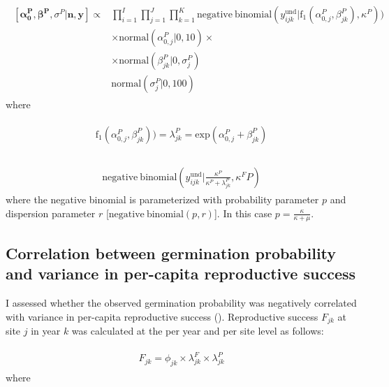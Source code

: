 \documentclass[12pt, oneside, titlepage]{article}   	%
\begin{document}
\begin{align}
  \begin{split}
 [ \bm{\alpha^P_0}, \bm{\beta^P}, \sigma^P | \bm{n}, \bm{y} ] \propto 
 & \prod_{i=1}^{I} \prod_{j=1}^{J} \prod_{k=1}^{K}  \mathrm{negative \ binomial} ( y^{\mathrm{und}}_{ijk} | \mathrm{f}_1(\alpha^P_{0,j} , \beta^P_{jk} ), \kappa^P ) )
     \\ & \times \mathrm{normal} ( \alpha^P_{0,j} | 0, 10)  \times 
     \\ & \times \mathrm{normal} ( \beta^P_{jk} | 0, \sigma^P_j) 
    \\ & \mathrm{normal} ( \sigma^P_j | 0, 100)  
   \end{split}
\end{align}
%
where

\begin{align}
  \begin{split}
\mathrm{f}_1(\alpha^P_{0,j} , \beta^P_{jk} ) ) = \lambda^P_{jk} = \mathrm{exp}( \alpha^P_{0,j} + \beta^P_{jk} ) \\
  \end{split}
\end{align}

\begin{align}
  \begin{split}
  \mathrm{negative \ binomial} ( y^{\mathrm{und}}_{ijk} | \frac{\kappa^P}{\kappa^P + \lambda^P_{jk}} ,  \kappa^FP)
  \end{split}
\end{align}
%
where the negative binomial is parameterized with probability parameter $p$ and dispersion parameter $r$ [$ \mathrm{negative \ binomial}(p,r)$]. In this case $p=\frac{\kappa}{\kappa+\mu}$.

\subsection*{Correlation between germination probability and variance in per-capita reproductive success}

I assessed whether the observed germination probability was negatively correlated with variance in per-capita reproductive success (\cite{venable2007}). Reproductive success $F_{jk}$ at site $j$ in year $k$ was calculated at the per year and per site level as follows:

\begin{align}
  \begin{split}
F_{jk} = \phi_{jk} \times \lambda^F_{jk} \times \lambda^P_{jk}
  \end{split}
\end{align}
%
where
\end{document}
